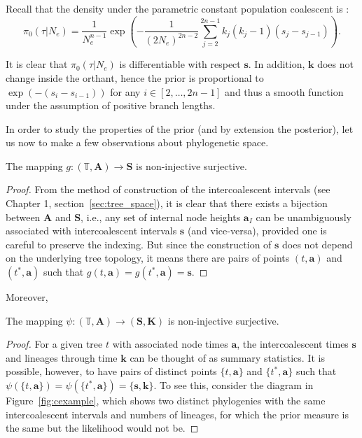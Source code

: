 Recall that the density under the parametric constant population coalescent is \cite[eq 5.1, pg. 81]{Drummond2002b}:
\begin{equation}
\label{eq:coal_prior_short} 
\pi_0(\tau| N_e) = \frac{1}{N_e^{n-1}}\exp\left(-\frac{1}{(2N_e)^{2n-2}}\sum_{j=2}^{2n-1} k_j(k_j -1)(s_j - s_{j-1}) \right).
\end{equation}

It is clear that $\pi_0(\tau| N_e)$ is differentiable with respect $\boldsymbol s$.
In addition, $\boldsymbol k$ does not change inside the orthant, hence the prior is  proportional to $\exp(-(s_i-s_{i-1}))$ for any $ i \in [2, \ldots, 2n-1]$ and thus a smooth function under the assumption of positive branch lengths.

In order to study the properties of the prior (and by extension the posterior), let us now to make a few observations about phylogenetic space.
\begin{remark}
\label{rmk:TBtoS}
 The mapping $g: (\mathbb{T}, \boldsymbol A) \to \boldsymbol S$ is non-injective surjective.
\end{remark}
\begin{proof}
From the method of construction of the intercoalescent intervals (see Chapter 1, section~\ref{sec:tree_space}), it is clear that there exists a bijection between $\boldsymbol A$ and $\boldsymbol S$, i.e., any set of internal node heights $\boldsymbol a_I$ can be unambiguously associated with intercoalescent intervals $\boldsymbol s$ (and vice-versa), provided one is careful to preserve the indexing.
But since the construction of $\boldsymbol s$ does not depend on the underlying tree topology, it means there are pairs of points $(t, \boldsymbol a)$ and $(t^\ast, \boldsymbol a)$ such that $g( t, \boldsymbol a) = g(t^\ast, \boldsymbol a) = \boldsymbol s$.
\end{proof}
Moreover,
\begin{remark}
\label{rmk:InvarCoal}
  The mapping $\psi : (\mathbb{T}, \boldsymbol A) \to (\boldsymbol S, \boldsymbol K)$ is non-injective surjective.
\end{remark}
\begin{proof}
 For a given tree  $t$ with associated node times $\boldsymbol a$, the intercoalescent times $\boldsymbol s$ and lineages through time $\boldsymbol k$ can be thought of as summary statistics.
It is possible, however, to have pairs of distinct points $\{t, \boldsymbol a\}$ and $\{t^\ast, \boldsymbol a\}$ such that $\psi( \{t, \boldsymbol a\}) = \psi(\{t^\ast, \boldsymbol a\}) = \{\boldsymbol s, \boldsymbol k\}$.
To see this, consider the diagram in Figure~\ref{fig:cexample}, which shows two distinct phylogenies with the same intercoalescent intervals and numbers of lineages, for which the prior measure is the same but the likelihood would not be.%
\end{proof}

